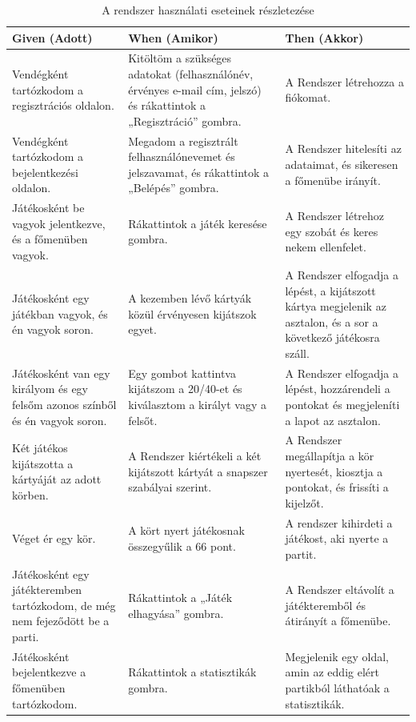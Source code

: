 \begin{table}[H]
  \centering
  \begin{tabular}{ | m{} | m{} | m{} | }
    \hline
    \textbf{Given (Adott)} & \textbf{When (Amikor)} & \textbf{Then (Akkor)} \\
    \hline \hline
    Vendégként tartózkodom a regisztrációs oldalon. & Kitöltöm a szükséges adatokat (felhasználónév, érvényes e-mail cím, jelszó) és rákattintok a „Regisztráció” gombra. & A Rendszer létrehozza a fiókomat. \\
    \hline
    Vendégként tartózkodom a bejelentkezési oldalon. & Megadom a regisztrált felhasználónevemet és jelszavamat, és rákattintok a „Belépés” gombra. & A Rendszer hitelesíti az adataimat, és sikeresen a főmenübe irányít. \\
    \hline
    Játékosként be vagyok jelentkezve, és a főmenüben vagyok. & Rákattintok a játék keresése gombra. & A Rendszer létrehoz egy szobát és keres nekem ellenfelet. \\
    \hline
    Játékosként egy játékban vagyok, és én vagyok soron. & A kezemben lévő kártyák közül érvényesen kijátszok egyet. & A Rendszer elfogadja a lépést, a kijátszott kártya megjelenik az asztalon, és a sor a következő játékosra száll. \\
    \hline
    Játékosként van egy királyom és egy felsőm azonos színből és én vagyok soron. & Egy gombot kattintva kijátszom a 20/40-et és kiválasztom a királyt vagy a felsőt. & A Rendszer elfogadja a lépést, hozzárendeli a pontokat és megjeleníti a lapot az asztalon. \\
    \hline
    Két játékos kijátszotta a kártyáját az adott körben. & A Rendszer kiértékeli a két kijátszott kártyát a snapszer szabályai szerint. & A Rendszer megállapítja a kör nyertesét, kiosztja a pontokat, és frissíti a kijelzőt. \\
    \hline
    Véget ér egy kör. & A kört nyert játékosnak összegyűlik a 66 pont. & A rendszer kihirdeti a játékost, aki nyerte a partit. \\
    \hline
    Játékosként egy játékteremben tartózkodom, de még nem fejeződött be a parti. & Rákattintok a „Játék elhagyása” gombra. & A Rendszer eltávolít a játékteremből és átirányít a főmenübe. \\
    \hline
    Játékosként bejelentkezve a főmenüben tartózkodom. & Rákattintok a statisztikák gombra. & Megjelenik egy oldal, amin az eddig elért partikból láthatóak a statisztikák. \\
    \hline
  \end{tabular}
  \caption{A rendszer használati eseteinek részletezése}
  \label{tab:use-case-scenarios}
\end{table}

